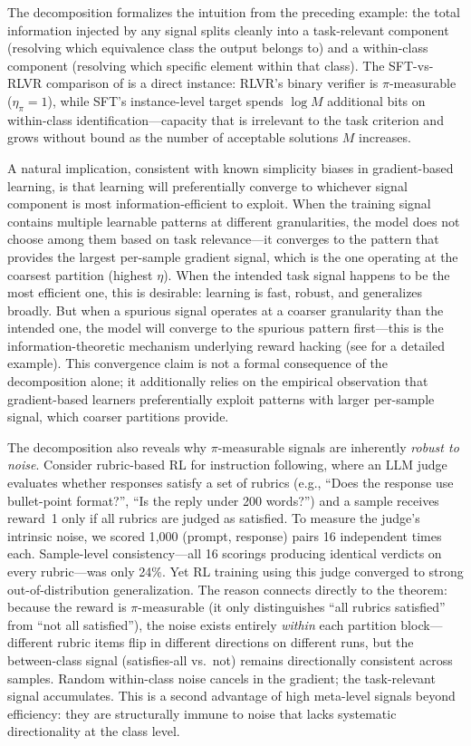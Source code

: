 \documentclass{article}
\theoremstyle{plain}
\theoremstyle{definition}
\theoremstyle{remark}
\begin{document}
The decomposition formalizes the intuition from the preceding example: the total information injected by any signal splits cleanly into a task-relevant component (resolving which equivalence class the output belongs to) and a within-class component (resolving which specific element within that class). The SFT-vs-RLVR comparison of  is a direct instance: RLVR's binary verifier is $\pi$-measurable ($\eta_\pi=1$), while SFT's instance-level target spends $\log M$ additional bits on within-class identification---capacity that is irrelevant to the task criterion and grows without bound as the number of acceptable solutions $M$ increases.

A natural implication, consistent with known simplicity biases in gradient-based learning, is that learning will preferentially converge to whichever signal component is most information-efficient to exploit. When the training signal contains multiple learnable patterns at different granularities, the model does not choose among them based on task relevance---it converges to the pattern that provides the largest per-sample gradient signal, which is the one operating at the coarsest partition (highest $\eta$). When the intended task signal happens to be the most efficient one, this is desirable: learning is fast, robust, and generalizes broadly. But when a spurious signal operates at a coarser granularity than the intended one, the model will converge to the spurious pattern first---this is the information-theoretic mechanism underlying reward hacking (see  for a detailed example). This convergence claim is not a formal consequence of the decomposition alone; it additionally relies on the empirical observation that gradient-based learners preferentially exploit patterns with larger per-sample signal, which coarser partitions provide.

The decomposition also reveals why $\pi$-measurable signals are inherently \textit{robust to noise}. Consider rubric-based RL for instruction following, where an LLM judge evaluates whether responses satisfy a set of rubrics (e.g., ``Does the response use bullet-point format?'', ``Is the reply under 200 words?'') and a sample receives reward~1 only if all rubrics are judged as satisfied. To measure the judge's intrinsic noise, we scored 1{,}000 (prompt, response) pairs 16 independent times each. Sample-level consistency---all 16 scorings producing identical verdicts on every rubric---was only 24\%. Yet RL training using this judge converged to strong out-of-distribution generalization. The reason connects directly to the theorem: because the reward is $\pi$-measurable (it only distinguishes ``all rubrics satisfied'' from ``not all satisfied''), the noise exists entirely \textit{within} each partition block---different rubric items flip in different directions on different runs, but the between-class signal (satisfies-all vs.\ not) remains directionally consistent across samples. Random within-class noise cancels in the gradient; the task-relevant signal accumulates. This is a second advantage of high meta-level signals beyond efficiency: they are structurally immune to noise that lacks systematic directionality at the class level.
\end{document}

